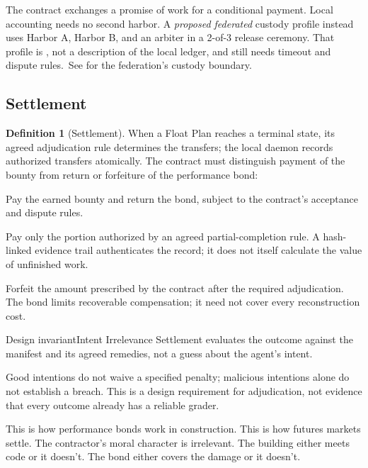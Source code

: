 \documentclass[11pt,a4paper]{article}
\theoremstyle{definition}
\newtheorem{definition}{Definition}[section]
\theoremstyle{remark}
\begin{document}
The contract exchanges a promise of work for a conditional payment. Local accounting needs no second harbor. A \emph{proposed federated} custody profile instead uses Harbor A, Harbor B, and an arbiter in a 2-of-3 release ceremony. That profile is \Designed{}, not a description of the local ledger, and still needs timeout and dispute rules.\ifpdbook\ See  for the federation's custody boundary.\fi

\subsection{Settlement}

\begin{definition}[Settlement]\label{def:settlement}
\setlength{\parskip}{4pt plus 1pt}
When a Float Plan reaches a terminal state, its agreed adjudication rule determines the transfers; the local daemon records authorized transfers atomically. The contract must distinguish payment of the bounty from return or forfeiture of the performance bond:
\begin{description}[nosep]
  \item[Success:] Pay the earned bounty and return the bond, subject to the contract's acceptance and dispute rules.
  \item[Partial completion:] Pay only the portion authorized by an agreed partial-completion rule. A hash-linked evidence trail authenticates the record; it does not itself calculate the value of unfinished work.
  \item[Breach:] Forfeit the amount prescribed by the contract after the required adjudication. The bond limits recoverable compensation; it need not cover every reconstruction cost.
\end{description}
\end{definition}

\begin{pdclaim}{Design invariant}{Intent Irrelevance}
\setlength{\parskip}{4pt plus 1pt}
\label{prop:intent}
Settlement evaluates the outcome against the manifest and its agreed remedies, not a guess about the agent's intent. 

Good intentions do not waive a specified penalty; malicious intentions alone do not establish a breach. This is a design requirement for adjudication, not evidence that every outcome already has a reliable grader.
\end{pdclaim}

This is how performance bonds work in construction. This is how futures markets settle. The contractor's moral character is irrelevant. The building either meets code or it doesn't. The bond either covers the damage or it doesn't.
\end{document}
